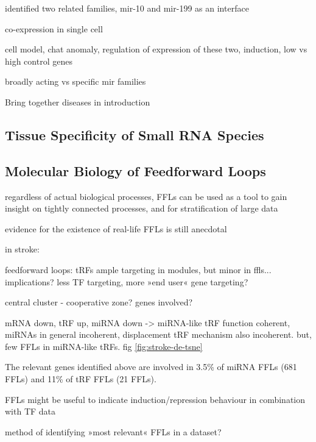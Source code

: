 identified two related families, mir-10 and mir-199 as an interface
 
 co-expression in single cell
 

cell model, chat anomaly, regulation of expression of these two, induction, low vs high control genes

broadly acting vs specific mir families



Bring together diseases in introduction

\subsection{Tissue Specificity of Small RNA Species} \label{sec:discussion:tissue}

\subsection{Molecular Biology of Feedforward Loops}
regardless of actual biological processes, FFLs can be used as a tool to gain insight on tightly connected processes, and for stratification of large data

evidence for the existence of real-life FFLs is still anecdotal

in stroke:

feedforward loops: tRFs ample targeting in modules, but minor in ffls... implications? less TF targeting, more »end user« gene targeting?

central cluster - cooperative zone? genes involved?

mRNA down, tRF up, miRNA down -> miRNA-like tRF function coherent, miRNAs in general incoherent, displacement tRF mechanism also incoherent. but, few FFLs in miRNA-like tRFs. fig \ref{fig:stroke-de-tsne}

The relevant genes identified above are involved in 3.5\% of miRNA FFLs (681 FFLs) and 11\% of tRF FFLs (21 FFLs). 

FFLs might be useful to indicate induction/repression behaviour in combination with TF data

method of identifying »most relevant« FFLs in a dataset?
